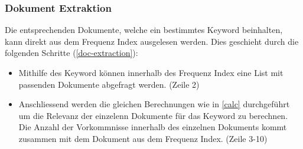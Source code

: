 \subsubsection{Dokument Extraktion}
Die entsprechenden Dokumente, welche ein bestimmtes \gls{Keyword} beinhalten, kann direkt aus dem Frequenz Index ausgelesen werden. Dies geschieht durch die folgenden Schritte (\autoref{doc-extraction}):
\begin{itemize}
    \item Mithilfe des \gls{Keyword} können innerhalb des Frequenz Index eine List mit passenden Dokumente abgefragt werden. (Zeile 2)
    \item Anschliessend werden die gleichen Berechnungen wie in \autoref{calc} durchgeführt um die Relevanz der einzelenn Dokumente für das \gls{Keyword} zu berechnen. Die Anzahl der Vorkommnisse innerhalb des einzelnen Dokuments kommt zusammen mit dem Dokument aus dem Frequenz Index. (Zeile 3-10)
\end{itemize}



